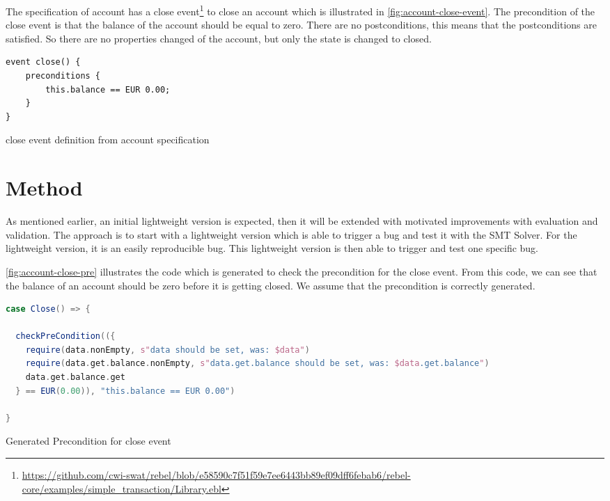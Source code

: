 The specification of account has a close event\footnote{\url{https://github.com/cwi-swat/rebel/blob/e58590c7f51f59e7ee6443bb89ef09dff6febab6/rebel-core/examples/simple_transaction/Library.ebl}}
to close an account which is illustrated in \autoref{fig:account-close-event}.
The precondition of the close event is that the balance of the account should be
equal to zero. There are no postconditions, this means that the postconditions
are satisfied. So there are no properties changed of the account, but only the state
is changed to closed.

\begin{sourcecode}[h!]
\begin{lstlisting}[]
event close() {
	preconditions {
		this.balance == EUR 0.00;
	}
}
\end{lstlisting}
\caption{close event definition from account specification}\label{fig:account-close-event}
\end{sourcecode}
\FloatBarrier

\section{Method}

As mentioned earlier, an initial lightweight version is expected, then it will be extended with motivated improvements with evaluation and validation. The approach is to start with a lightweight version which is able to trigger a bug and test it with the SMT Solver. For the lightweight version, it is an easily reproducible bug. This lightweight version is then able to trigger and test one specific bug.

\autoref{fig:account-close-pre} illustrates the code which is generated to check the precondition for the close event. From this code, we can see that the balance of an account should be zero before it is getting closed. We assume that the precondition is correctly generated.

\begin{sourcecode}[h!]
\begin{lstlisting}[language=scala]
case Close() => {

  checkPreCondition(({
    require(data.nonEmpty, s"data should be set, was: $data")
    require(data.get.balance.nonEmpty, s"data.get.balance should be set, was: $data.get.balance")
    data.get.balance.get
  } == EUR(0.00)), "this.balance == EUR 0.00")

}
\end{lstlisting}
\caption{Generated Precondition for close event}\label{fig:account-close-pre}
\end{sourcecode}
\FloatBarrier

